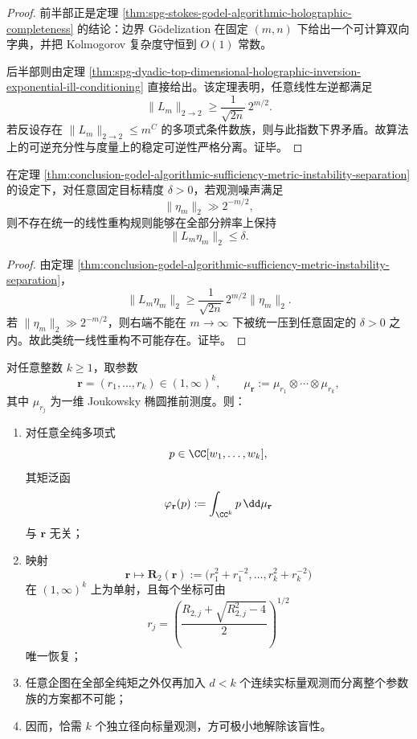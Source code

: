 \begin{proof}
前半部正是定理 \ref{thm:spg-stokes-godel-algorithmic-holographic-completeness} 的结论：边界 Gödelization 在固定 \((m,n)\) 下给出一个可计算双向字典，并把 Kolmogorov 复杂度守恒到 \(O(1)\) 常数。

后半部则由定理 \ref{thm:spg-dyadic-top-dimensional-holographic-inversion-exponential-ill-conditioning} 直接给出。该定理表明，任意线性左逆都满足
\[
\|L_m\|_{2\to 2}\ge \frac{1}{\sqrt{2n}}\,2^{m/2}.
\]
若反设存在 \(\|L_m\|_{2\to 2}\le m^C\) 的多项式条件数族，则与此指数下界矛盾。故算法上的可逆充分性与度量上的稳定可逆性严格分离。证毕。
\end{proof}

\begin{corollary}[噪声阈值下的统一线性重构不可能性]\label{cor:conclusion-godel-noise-threshold-no-uniform-linear-reconstruction}
在定理 \ref{thm:conclusion-godel-algorithmic-sufficiency-metric-instability-separation} 的设定下，对任意固定目标精度 \(\delta>0\)，若观测噪声满足
\[
\|\eta_m\|_2\gg 2^{-m/2},
\]
则不存在统一的线性重构规则能够在全部分辨率上保持
\[
\|L_m\eta_m\|_2\le \delta.
\]
\end{corollary}

\begin{proof}
由定理 \ref{thm:conclusion-godel-algorithmic-sufficiency-metric-instability-separation}，
\[
\|L_m\eta_m\|_2\ge \frac{1}{\sqrt{2n}}\,2^{m/2}\|\eta_m\|_2.
\]
若 \(\|\eta_m\|_2\gg 2^{-m/2}\)，则右端不能在 \(m\to\infty\) 下被统一压到任意固定的 \(\delta>0\) 之内。故此类统一线性重构不可能存在。证毕。
\end{proof}

\begin{theorem}\label{thm:conclusion-joukowsky-product-analytic-blindness-minimal-radial-sufficiency}
对任意整数 \(k\ge 1\)，取参数
\[
\mathbf r=(r_1,\dots,r_k)\in(1,\infty)^k,
\qquad
\mu_{\mathbf r}:=\mu_{r_1}\otimes\cdots\otimes\mu_{r_k},
\]
其中 \(\mu_{r_j}\) 为一维 Joukowsky 椭圆推前测度。则：
\begin{enumerate}
  \item 对任意全纯多项式
        \[
        p\in\CC[w_1,\dots,w_k],
        \]
        其矩泛函
        \[
        \varphi_{\mathbf r}(p):=\int_{\CC^k}p\,\dd\mu_{\mathbf r}
        \]
        与 \(\mathbf r\) 无关；
  \item 映射
        \[
        \mathbf r\longmapsto \mathbf R_2(\mathbf r):=
        \bigl(r_1^2+r_1^{-2},\dots,r_k^2+r_k^{-2}\bigr)
        \]
        在 \((1,\infty)^k\) 上为单射，且每个坐标可由
        \[
        r_j=
        \left(
        \frac{R_{2,j}+\sqrt{R_{2,j}^2-4}}{2}
        \right)^{1/2}
        \]
        唯一恢复；
  \item 任意企图在全部全纯矩之外仅再加入 \(d<k\) 个连续实标量观测而分离整个参数族的方案都不可能；
  \item 因而，恰需 \(k\) 个独立径向标量观测，方可极小地解除该盲性。
\end{enumerate}
\end{theorem}

